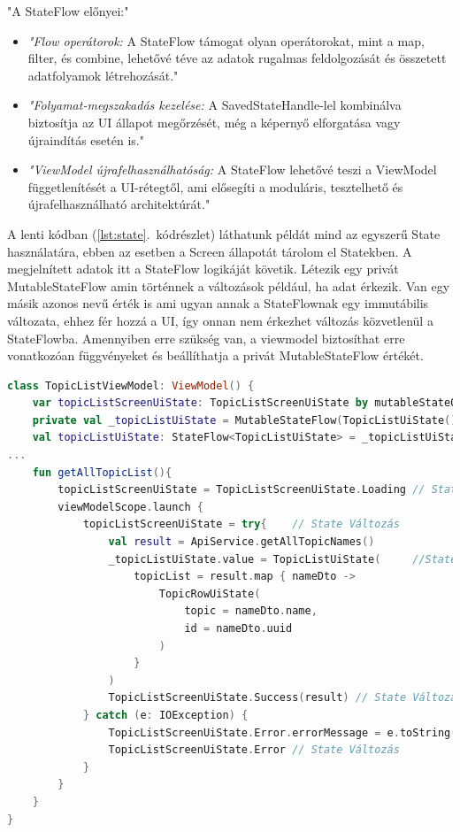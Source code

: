 "A StateFlow előnyei:"\cite{StateVsStateFlow}
\begin{itemize}
    \item \emph{"Flow operátorok:} A StateFlow támogat olyan operátorokat, mint a map, filter, és combine, lehetővé téve az adatok rugalmas feldolgozását és összetett adatfolyamok létrehozását."
    \item \emph{"Folyamat-megszakadás kezelése:} A SavedStateHandle-lel kombinálva biztosítja az UI állapot megőrzését, még a képernyő elforgatása vagy újraindítás esetén is."
    \item \emph{"ViewModel újrafelhasználhatóság:} A StateFlow lehetővé teszi a ViewModel függetlenítését a UI-rétegtől, ami elősegíti a moduláris, tesztelhető és újrafelhasználható architektúrát."
\end{itemize}

A lenti kódban (\ref{lst:state}.~kódrészlet) láthatunk példát mind az egyszerű State használatára, ebben az esetben a Screen állapotát tárolom el Statekben.
A megjelnített adatok itt a StateFlow logikáját követik. 
Létezik egy privát MutableStateFlow amin történnek a változások például, ha adat érkezik.
Van egy másik azonos nevű érték is ami ugyan annak a StateFlownak egy immutábilis változata, ehhez fér hozzá a UI, így onnan nem érkezhet változás közvetlenül a StateFlowba.
Amennyiben erre szükség van, a viewmodel biztosíthat erre vonatkozóan függvényeket és beállíthatja a privát MutableStateFlow értékét.

\begin{lstlisting}[caption={Példa a State és StateFlow használatára.}, label={lst:state}, language=Kotlin]
class TopicListViewModel: ViewModel() {
    var topicListScreenUiState: TopicListScreenUiState by mutableStateOf(TopicListScreenUiState.Loading)
    private val _topicListUiState = MutableStateFlow(TopicListUiState())
    val topicListUiState: StateFlow<TopicListUiState> = _topicListUiState
...
    fun getAllTopicList(){
        topicListScreenUiState = TopicListScreenUiState.Loading // State Változás
        viewModelScope.launch {
            topicListScreenUiState = try{    // State Változás
                val result = ApiService.getAllTopicNames()
                _topicListUiState.value = TopicListUiState(     //StateFlow Változás
                    topicList = result.map { nameDto ->
                        TopicRowUiState(
                            topic = nameDto.name,
                            id = nameDto.uuid
                        )
                    }
                )
                TopicListScreenUiState.Success(result) // State Változás
            } catch (e: IOException) {
                TopicListScreenUiState.Error.errorMessage = e.toString()// "Network error"
                TopicListScreenUiState.Error // State Változás
            }
        }
    }
}
\end{lstlisting}

